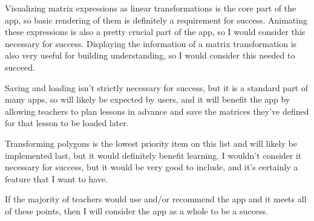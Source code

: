 \documentclass[../main.tex]{subfiles}
\begin{document}
Visualizing matrix expressions as linear transformations is the core part of the app, so basic rendering of them is definitely a requirement for success. Animating these expressions is also a pretty crucial part of the app, so I would consider this necessary for success. Displaying the information of a matrix transformation is also very useful for building understanding, so I would consider this needed to succeed.

Saving and loading isn't strictly necessary for success, but it is a standard part of many apps, so will likely be expected by users, and it will benefit the app by allowing teachers to plan lessons in advance and save the matrices they've defined for that lesson to be loaded later.

Transforming polygons is the lowest priority item on this list and will likely be implemented last, but it would definitely benefit learning. I wouldn't consider it necessary for success, but it would be very good to include, and it's certainly a feature that I want to have.

If the majority of teachers would use and/or recommend the app and it meets all of these points, then I will consider the app as a whole to be a success.
\end{document}
